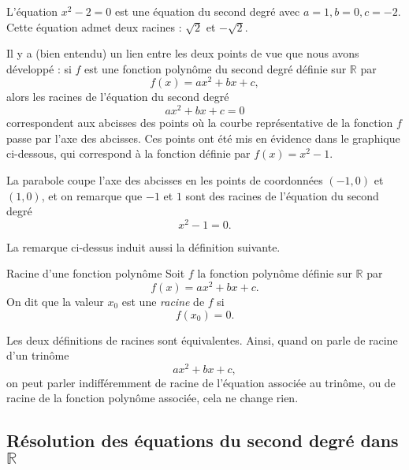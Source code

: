 \documentclass[11pt]{article}
\begin{document}
\begin{exemple}
  L'équation $x^2-2=0$ est une équation du second degré avec $a=1, b=0, c=-2$.
  Cette équation admet deux racines : $\sqrt 2$ et $-\sqrt 2$.
\end{exemple}

\begin{rmq}
  Il y a (bien entendu) un lien entre les deux points de vue que nous avons
  développé : si $f$ est une fonction polynôme du second degré définie sur
  $\mathbb{R}$ par
  \[
    f(x) = ax^2+bx+c,
  \]
  alors les racines de l'équation du second degré
  \[
    ax^2+bx+c = 0
  \]
  correspondent aux abcisses des points où la courbe représentative de la
  fonction $f$ passe par l'axe des abcisses. Ces points ont été mis en
  évidence dans le graphique ci-dessous, qui correspond à la fonction définie
  par $f(x) = x^2-1$.
 \begin{center}
\end{center}
La parabole coupe l'axe des abcisses en les points de coordonnées $(-1, 0)$ et
$(1, 0)$, et on remarque que $-1$ et $1$ sont des racines de l'équation du second
degré
\[
  x^2-1 = 0.
\]
\end{rmq}
La remarque ci-dessus induit aussi la définition suivante.
\begin{defi}{Racine d'une fonction polynôme}
  Soit $f$ la fonction polynôme définie sur $\mathbb{R}$ par
  \[
    f(x) = ax^2+bx+c.
  \]
  On dit que la valeur $x_0$ est une \emph{racine} de $f$ si
  \[
    f(x_0) = 0.
  \]
\end{defi}

\begin{rmq}
  Les deux définitions de racines sont équivalentes. Ainsi, quand on parle de racine d'un
  trinôme $$ax^2+bx+c,$$ on peut parler indifféremment de racine de l'équation
  associée au trinôme, ou de racine de la fonction polynôme associée, cela ne
  change rien.
\end{rmq}

\subsection{Résolution des équations du second degré dans $\mathbb{R}$}
\end{document}
